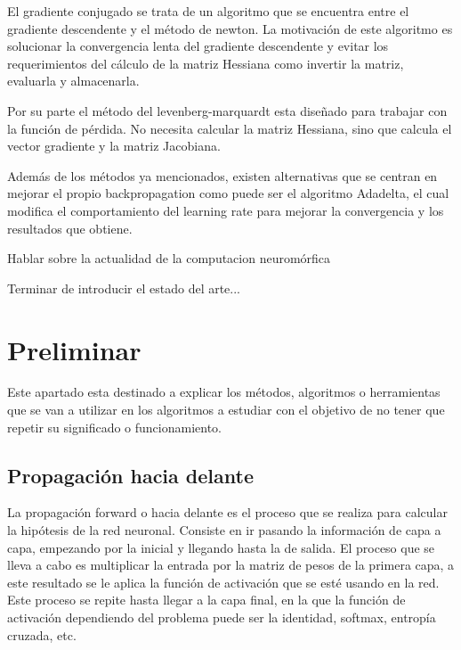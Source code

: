 El gradiente conjugado \cite{RefWorks:RefID:13-johansson1991backpropagation} se trata de un algoritmo que se encuentra entre el gradiente descendente y el método de newton. La motivación de este algoritmo es solucionar la convergencia lenta del gradiente descendente y evitar los requerimientos del cálculo de la matriz Hessiana como invertir la matriz, evaluarla y almacenarla. 

Por su parte el método del levenberg-marquardt esta diseñado para trabajar con la función de pérdida. No necesita calcular la matriz Hessiana, sino que calcula el vector gradiente y la matriz Jacobiana.

Además de los métodos ya mencionados, existen alternativas que se centran en mejorar el propio backpropagation como puede ser el algoritmo Adadelta, el cual modifica el comportamiento del learning rate para mejorar la convergencia y los resultados que obtiene. 




Hablar sobre la actualidad de la computacion neuromórfica



Terminar de introducir el estado del arte...


\section{Preliminar}

Este apartado esta destinado a explicar los métodos, algoritmos o herramientas que se van a utilizar en los algoritmos a estudiar con el objetivo de no tener que repetir su significado o funcionamiento.


\subsection{Propagación hacia delante}

La propagación forward o hacia delante es el proceso que se realiza para calcular la hipótesis de la red neuronal. Consiste en ir pasando la información de capa a capa, empezando por la inicial y llegando hasta la de salida. El proceso que se lleva a cabo es multiplicar la entrada por la matriz de pesos de la primera capa, a este resultado se le aplica la función de activación que se esté usando en la red. Este proceso se repite hasta llegar a la capa final, en la que la función de activación dependiendo del problema puede ser la identidad, softmax, entropía cruzada, etc.

